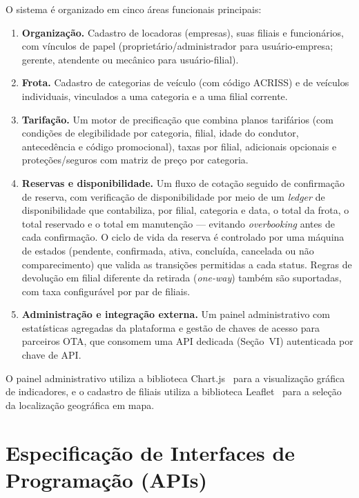 \documentclass[conference,a4paper]{IEEEtran}
\begin{document}
O sistema é organizado em cinco áreas funcionais principais:

\begin{enumerate}
  \item \textbf{Organização.} Cadastro de locadoras (empresas), suas filiais e funcionários, com vínculos de papel (proprietário/administrador para usuário-empresa; gerente, atendente ou mecânico para usuário-filial).

  \item \textbf{Frota.} Cadastro de categorias de veículo (com código ACRISS) e de veículos individuais, vinculados a uma categoria e a uma filial corrente.

  \item \textbf{Tarifação.} Um motor de precificação que combina planos tarifários (com condições de elegibilidade por categoria, filial, idade do condutor, antecedência e código promocional), taxas por filial, adicionais opcionais e proteções/seguros com matriz de preço por categoria.

  \item \textbf{Reservas e disponibilidade.} Um fluxo de cotação seguido de confirmação de reserva, com verificação de disponibilidade por meio de um \textit{ledger} de disponibilidade que contabiliza, por filial, categoria e data, o total da frota, o total reservado e o total em manutenção --- evitando \textit{overbooking} antes de cada confirmação. O ciclo de vida da reserva é controlado por uma máquina de estados (pendente, confirmada, ativa, concluída, cancelada ou não comparecimento) que valida as transições permitidas a cada status. Regras de devolução em filial diferente da retirada (\textit{one-way}) também são suportadas, com taxa configurável por par de filiais.

  \item \textbf{Administração e integração externa.} Um painel administrativo com estatísticas agregadas da plataforma e gestão de chaves de acesso para parceiros OTA, que consomem uma API dedicada (Seção~VI) autenticada por chave de API.
\end{enumerate}

O painel administrativo utiliza a biblioteca Chart.js~\cite{chartjs} para a visualização gráfica de indicadores, e o cadastro de filiais utiliza a biblioteca Leaflet~\cite{leaflet} para a seleção da localização geográfica em mapa.

\section{Especificação de Interfaces de Programação (APIs)}
\end{document}
